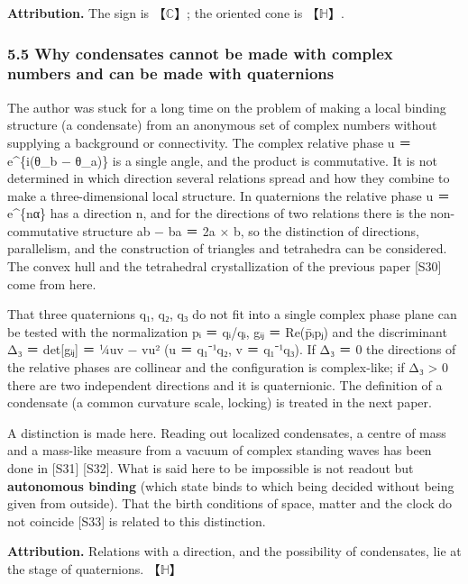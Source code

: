 \documentclass[
  a4paper,
]{article}
\begin{document}
\textbf{Attribution.} The sign is 【\(\mathbb{C}\)】; the oriented cone
is 【\(\mathbb{H}\)】.

\subsubsection{5.5 Why condensates cannot be made with complex numbers
and can be made with
quaternions}\label{why-condensates-cannot-be-made-with-complex-numbers-and-can-be-made-with-quaternions}

The author was stuck for a long time on the problem of making a local
binding structure (a condensate) from an anonymous set of complex
numbers without supplying a background or connectivity. The complex
relative phase u ＝ e\^{}\{i(θ\_b − θ\_a)\} is a single angle, and the
product is commutative. It is not determined in which direction several
relations spread and how they combine to make a three-dimensional local
structure. In quaternions the relative phase u ＝ e\^{}\{nα\} has a
direction n, and for the directions of two relations there is the
non-commutative structure ab − ba ＝ 2a × b, so the distinction of
directions, parallelism, and the construction of triangles and
tetrahedra can be considered. The convex hull and the tetrahedral
crystallization of the previous paper {[}S30{]} come from here.

That three quaternions q₁, q₂, q₃ do not fit into a single complex phase
plane can be tested with the normalization pᵢ ＝ qᵢ/\textbar qᵢ\textbar,
gᵢⱼ ＝ Re(p̄ᵢpⱼ) and the discriminant Δ₃ ＝ det{[}gᵢⱼ{]} ＝ ¼\textbar uv
− vu\textbar² (u ＝ q₁⁻¹q₂, v ＝ q₁⁻¹q₃). If Δ₃ ＝ 0 the directions of
the relative phases are collinear and the configuration is complex-like;
if Δ₃ \textgreater{} 0 there are two independent directions and it is
quaternionic. The definition of a condensate (a common curvature scale,
locking) is treated in the next paper.

A distinction is made here. Reading out localized condensates, a centre
of mass and a mass-like measure from a vacuum of complex standing waves
has been done in {[}S31{]} {[}S32{]}. What is said here to be impossible
is not readout but \textbf{autonomous binding} (which state binds to
which being decided without being given from outside). That the birth
conditions of space, matter and the clock do not coincide {[}S33{]} is
related to this distinction.

\textbf{Attribution.} Relations with a direction, and the possibility of
condensates, lie at the stage of quaternions. 【\(\mathbb{H}\)】
\end{document}
